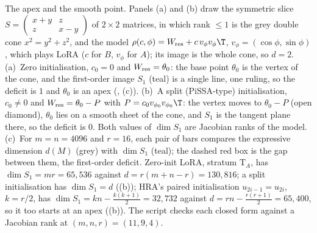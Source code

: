 The apex and the smooth point. Panels (a) and (b) draw the symmetric slice $S=\left(\begin{smallmatrix}x+y&z\\ z&x-y\end{smallmatrix}\right)$ of $2\times2$ matrices, in which rank $\le1$ is the grey double cone $x^2=y^2+z^2$, and the model $\rho(c,\phi)=W_{\rm res}+c\,v_\phi v_\phi\T$, $v_\phi=(\cos\phi,\sin\phi)$, which plays LoRA ($c$ for $B$, $v_\phi$ for $A$); its image is the whole cone, so $d=2$. (a)~Zero initialisation, $c_0=0$ and $W_{\rm res}=\theta_0$: the base point $\theta_0$ is the vertex of the cone, and the first-order image $S_1$ (teal) is a single line, one ruling, so the deficit is $1$ and $\theta_0$ is an apex (, (c)). (b)~A split (PiSSA-type) initialisation, $c_0\ne0$ and $W_{\rm res}=\theta_0-P$ with $P=c_0v_{\phi_0}v_{\phi_0}\T$: the vertex moves to $\theta_0-P$ (open diamond), $\theta_0$ lies on a smooth sheet of the cone, and $S_1$ is the tangent plane there, so the deficit is $0$. Both values of $\dim S_1$ are Jacobian ranks of the model. (c)~For $m=n=4096$ and $r=16$, each pair of bars compares the expressive dimension $d(M)$ (grey) with $\dim S_1$ (teal); the dashed red box is the gap between them, the first-order deficit. Zero-init LoRA, stratum $\mathrm T_A$, has $\dim S_1=mr=65{,}536$ against $d=r(m+n-r)=130{,}816$; a split initialisation has $\dim S_1=d$ ((b)); HRA's paired initialisation $u_{2i-1}=u_{2i}$, $k=r/2$, has $\dim S_1=kn-\tfrac{k(k+1)}2=32{,}732$ against $d=rn-\tfrac{r(r+1)}2=65{,}400$, so it too starts at an apex ((b)). The script checks each closed form against a Jacobian rank at $(m,n,r)=(11,9,4)$.
